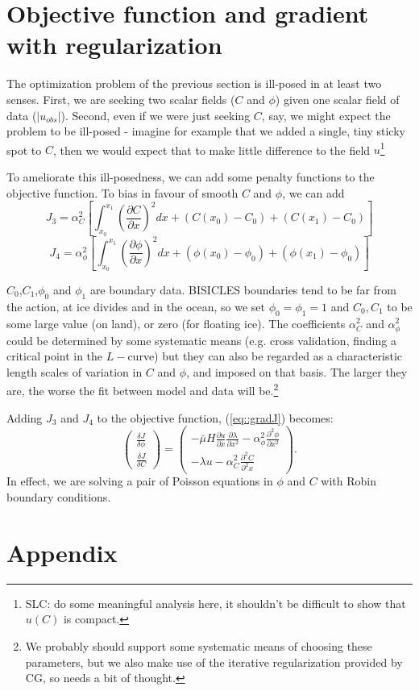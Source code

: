 \documentclass{article}
\begin{document}
\section{Objective function and gradient with regularization}

The optimization problem of the previous section is ill-posed in at least two senses.
First, we are seeking two scalar fields ($C$ and $\phi$) given one scalar field 
of data ($|u _{obs}|$). Second, even if we were just seeking $C$, say, we might expect the
problem to be ill-posed - imagine for example that we added a single, tiny sticky spot to
$C$, then we would expect that to make little difference to the field $u$\footnote{SLC: do some meaningful analysis here, it shouldn't be 
difficult to show that $u(C)$ is compact.}

To ameliorate this ill-posedness, we can add some penalty functions to the objective function. To
bias in favour of smooth $C$ and $\phi$, we can add 
\begin{equation}
J_{3}  = \alpha _C ^2 \left [ \int _{x_0} ^{x_1} \left ( \frac{\partial C}{ \partial x} \right )^ 2 dx + (C(x_0) - C_0) +(C(x_1) - C_0)   \right ] 
\end{equation} 
\begin{equation}
J_{4}  = \alpha _\phi ^2 \left [ \int _{x_0} ^{x_1} \left ( \frac{\partial \phi}{ \partial x} \right )^ 2 dx + (\phi(x_0) - \phi_0) +(\phi(x_1) - \phi_0)   \right ] 
\end{equation} 

$C_0$,$C_1$,$\phi_0$ and $\phi _1$ are boundary data. BISICLES boundaries tend to be far from the action, at
ice divides and in the ocean, so we set  $\phi_0 = \phi _1 = 1$ and $C_0,C_1$ to be some large value (on land),
or zero (for floating ice). The coefficients $\alpha _C ^2$ and $\alpha _\phi ^2$ could be determined by some systematic means 
(e.g. cross validation, finding a critical point in the $L-$curve) but they can also be regarded
as a characteristic length scales of variation in $C$ and $\phi$, and imposed on that basis. The larger they
are, the worse the fit between model and data will be.\footnote{We probably should support some systematic means of choosing
these parameters, but we also make use of the iterative regularization provided by CG, so needs a bit of thought.}

Adding $J_3$ and $J_4$ to the objective function, (\ref{eq::gradJ}) becomes:
\begin{equation}
\label{eq::gradJTikh}
\left (
\begin{array}{l}
\frac{\delta J}{\delta \phi} \\
\frac{\delta J}{\delta C} 
\end{array} 
\right ) = \left ( 
\begin{array}{l}
  - \bar{\mu} H \frac{\partial u}{\partial x}\frac{\partial \lambda}{\partial x^2} - \alpha^2_\phi \frac{\partial^2 \phi}{\partial x^2} \\
  - \lambda u - \alpha^2_C \frac{\partial^2 C}{\partial^2 x}
\end{array} 
\right ).
\end{equation}
In effect, we are solving a pair of Poisson equations in $\phi$ and $C$ with Robin boundary conditions.


\section*{Appendix}



\end{document}
